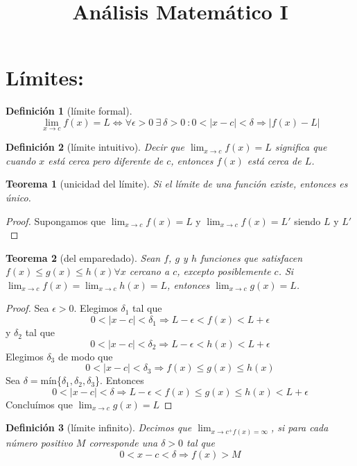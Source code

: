 \documentclass{article}
\title{Análisis Matemático I}
\date{}
\author{}
\newtheorem*{theorem}{Teorema}
\newtheorem*{definition}{Definición}
\begin{document}
  \maketitle
  \section*{Límites:} 
    \begin{definition}[límite formal]
      \[
        \lim_{x\to c}f(x)=L\iff\forall\epsilon>0 \ \exists\ \delta>0\ :0<|x-c|<\delta\Longrightarrow
        |f(x)-L| 
      \]
    \end{definition}
    \begin{definition}[límite intuitivo]
      Decir que $\lim_{x\to c}f(x)=L$ significa  que cuando $x$ está cerca pero diferente de $c$,
      entonces $f(x)$ está cerca de $L$.
    \end{definition}
    \begin{theorem}[unicidad del límite]
      Si el límite de una función existe, entonces es único.
    \end{theorem}
    \begin{proof}
      Supongamos que $\lim_{x\to c}f(x)=L$ y  $\lim_{x\to c}f(x)=L'$ siendo $L$ y $L'$
    \end{proof}
    \begin{theorem}[del emparedado]
      Sean $f$, $g$ y $h$ funciones que satisfacen $f(x)\leqslant g(x)\leqslant h(x)\forall x$
      cercano a $c$, excepto posiblemente $c$. Si $\lim_{x\to c}f(x)=\lim_{x\to c}h(x)=L$, entonces
      $\lim_{x\to c}g(x)=L$.
    \end{theorem}
    \begin{proof}
      Sea $\epsilon>0$. Elegimos $\delta_1$ tal que
      \[
        0<|x-c|<\delta_1\Longrightarrow L-\epsilon<f(x)<L+\epsilon
      \]
      y $\delta_2$ tal que
      \[
        0<|x-c|<\delta_2\Longrightarrow L-\epsilon<h(x)<L+\epsilon
      \]
      Elegimos $\delta_3$ de modo que
      \[
        0<|x-c|<\delta_3\Longrightarrow f(x)\leqslant g(x)\leqslant h(x)
      \]
      Sea $\delta=$mín\{$\delta_1,\delta_2,\delta_3$\}. Entonces
      \[
        0<|x-c|<\delta\Longrightarrow L-\epsilon<f(x)\leqslant g(x)\leqslant h(x)<L+\epsilon
      \]
      Concluímos que $\lim_{x\to c}g(x)=L$
    \end{proof}
    \begin{definition}[límite infinito]
      Decimos que $\lim_{x\to c^+f(x)=\infty}$, si para cada número positivo $M$ corresponde una
      $\delta>0$ tal que
      \[
        0<x-c<\delta\Longrightarrow f(x)>M
      \]
    \end{definition}
    \newpage
\end{document}
